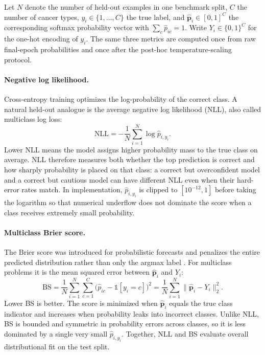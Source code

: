 \documentclass[11pt]{article}
\begin{document}
Let $N$ denote the number of held-out examples in one benchmark split, $C$ the number of cancer types, $y_i\in\{1,\ldots,C\}$ the true label, and $\hat{\mathbf{p}}_i\in[0,1]^C$ the corresponding softmax probability vector with $\sum_c \hat{p}_{ic}=1$. Write $Y_i\in\{0,1\}^C$ for the one-hot encoding of $y_i$. The same three metrics are computed once from raw final-epoch probabilities and once after the post-hoc temperature-scaling protocol.

\paragraph{Negative log likelihood.}
Cross-entropy training optimizes the log-probability of the correct class. A natural held-out analogue is the average negative log likelihood (NLL), also called multiclass log loss:
\begin{equation}
  \mathrm{NLL} =
  -\frac{1}{N}\sum_{i=1}^{N}\log \hat{p}_{i,y_i}.
  \label{eq:nll}
\end{equation}
\noindent Lower NLL means the model assigns higher probability mass to the true class on average. NLL therefore measures both whether the top prediction is correct and how sharply probability is placed on that class: a correct but overconfident model and a correct but cautious model can have different NLL even when their hard-error rates match. In implementation, $\hat{p}_{i,y_i}$ is clipped to $[10^{-12},1]$ before taking the logarithm so that numerical underflow does not dominate the score when a class receives extremely small probability.

\paragraph{Multiclass Brier score.}
The Brier score was introduced for probabilistic forecasts and penalizes the entire predicted distribution rather than only the argmax label \citep{brier1950verification}. For multiclass problems it is the mean squared error between $\hat{\mathbf{p}}_i$ and $Y_i$:
\begin{equation}
  \mathrm{BS} =
  \frac{1}{N}\sum_{i=1}^{N}\sum_{c=1}^{C}
  \bigl(\hat{p}_{ic}-\mathbb{1}[y_i=c]\bigr)^2
  =
  \frac{1}{N}\sum_{i=1}^{N}\|\hat{\mathbf{p}}_i-Y_i\|_2^2.
  \label{eq:brier}
\end{equation}
\noindent Lower BS is better. The score is minimized when $\hat{\mathbf{p}}_i$ equals the true class indicator and increases when probability leaks into incorrect classes. Unlike NLL, BS is bounded and symmetric in probability errors across classes, so it is less dominated by a single very small $\hat{p}_{i,y_i}$. Together, NLL and BS evaluate overall distributional fit on the test split.
\end{document}
